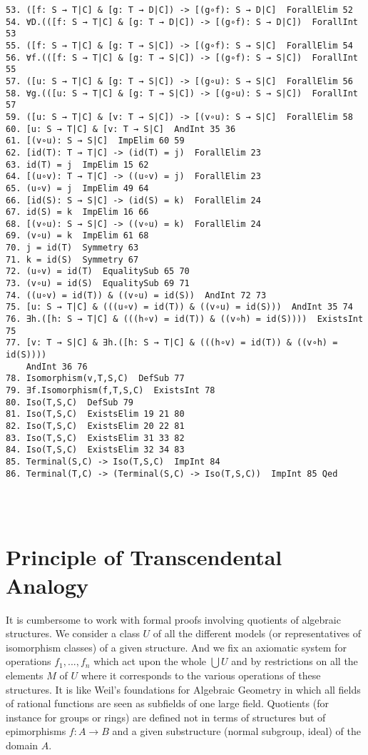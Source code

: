 \documentclass[12pt,leqno]{article}
\numberwithin{equation}{section}
\begin{document}
\begin{verbatim}
53. ([f: S → T|C] & [g: T → D|C]) -> [(g∘f): S → D|C]  ForallElim 52
54. ∀D.(([f: S → T|C] & [g: T → D|C]) -> [(g∘f): S → D|C])  ForallInt 53
55. ([f: S → T|C] & [g: T → S|C]) -> [(g∘f): S → S|C]  ForallElim 54
56. ∀f.(([f: S → T|C] & [g: T → S|C]) -> [(g∘f): S → S|C])  ForallInt 55
57. ([u: S → T|C] & [g: T → S|C]) -> [(g∘u): S → S|C]  ForallElim 56
58. ∀g.(([u: S → T|C] & [g: T → S|C]) -> [(g∘u): S → S|C])  ForallInt 57
59. ([u: S → T|C] & [v: T → S|C]) -> [(v∘u): S → S|C]  ForallElim 58
60. [u: S → T|C] & [v: T → S|C]  AndInt 35 36
61. [(v∘u): S → S|C]  ImpElim 60 59
62. [id(T): T → T|C] -> (id(T) = j)  ForallElim 23
63. id(T) = j  ImpElim 15 62
64. [(u∘v): T → T|C] -> ((u∘v) = j)  ForallElim 23
65. (u∘v) = j  ImpElim 49 64
66. [id(S): S → S|C] -> (id(S) = k)  ForallElim 24
67. id(S) = k  ImpElim 16 66
68. [(v∘u): S → S|C] -> ((v∘u) = k)  ForallElim 24
69. (v∘u) = k  ImpElim 61 68
70. j = id(T)  Symmetry 63
71. k = id(S)  Symmetry 67
72. (u∘v) = id(T)  EqualitySub 65 70
73. (v∘u) = id(S)  EqualitySub 69 71
74. ((u∘v) = id(T)) & ((v∘u) = id(S))  AndInt 72 73
75. [u: S → T|C] & (((u∘v) = id(T)) & ((v∘u) = id(S)))  AndInt 35 74
76. ∃h.([h: S → T|C] & (((h∘v) = id(T)) & ((v∘h) = id(S))))  ExistsInt 75
77. [v: T → S|C] & ∃h.([h: S → T|C] & (((h∘v) = id(T)) & ((v∘h) = id(S))))
    AndInt 36 76
78. Isomorphism(v,T,S,C)  DefSub 77
79. ∃f.Isomorphism(f,T,S,C)  ExistsInt 78
80. Iso(T,S,C)  DefSub 79
81. Iso(T,S,C)  ExistsElim 19 21 80
82. Iso(T,S,C)  ExistsElim 20 22 81
83. Iso(T,S,C)  ExistsElim 31 33 82
84. Iso(T,S,C)  ExistsElim 32 34 83
85. Terminal(S,C) -> Iso(T,S,C)  ImpInt 84
86. Terminal(T,C) -> (Terminal(S,C) -> Iso(T,S,C))  ImpInt 85 Qed
	
	
	
\end{verbatim}

\section*{Principle of Transcendental Analogy}

It is cumbersome to work with formal proofs involving quotients of algebraic structures.
We consider a class $U$ of all the different models (or representatives of isomorphism classes) of a given structure. And we fix an axiomatic system for operations $f_1,...,f_n$ which act upon the whole $\bigcup U$ and by restrictions on all the elements $M$ of  $U$ where it corresponds to the various operations of these structures.  It is like Weil's foundations for Algebraic Geometry in which all fields of rational functions are seen as subfields of one large field.
Quotients (for instance for groups or rings) are defined not in terms of structures but of epimorphisms $f:A\rightarrow B$  and a given substructure (normal subgroup, ideal) of the domain $A$.
\end{document}
